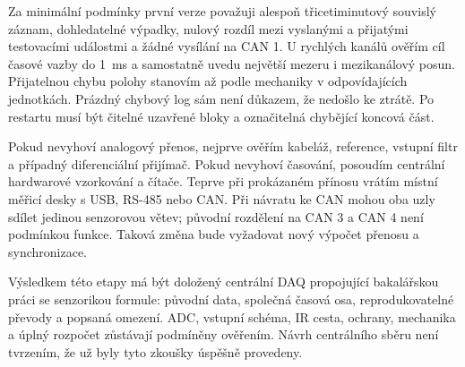 Za minimální podmínky první verze považuji alespoň třicetiminutový
souvislý záznam, dohledatelné výpadky, nulový rozdíl mezi vyslanými
a přijatými testovacími událostmi a žádné vysílání na CAN 1.
U rychlých kanálů ověřím cíl časové vazby do \SI{1}{ms} a samostatně
uvedu největší mezeru i mezikanálový posun. Přijatelnou chybu polohy
stanovím až podle mechaniky v odpovídajících jednotkách. Prázdný
chybový log sám není důkazem, že nedošlo ke ztrátě. Po restartu musí
být čitelné uzavřené bloky a označitelná chybějící koncová část.

Pokud nevyhoví analogový přenos, nejprve ověřím kabeláž, reference,
vstupní filtr a případný diferenciální přijímač. Pokud nevyhoví
časování, posoudím centrální hardwarové vzorkování a čítače.
Teprve při prokázaném přínosu vrátím místní měřicí desky s USB,
RS-485 nebo CAN. Při návratu ke CAN mohou oba uzly sdílet jedinou
senzorovou větev; původní rozdělení na CAN 3 a CAN 4 není podmínkou
funkce. Taková změna bude vyžadovat nový výpočet přenosu a synchronizace.

Výsledkem této etapy má být doložený centrální DAQ propojující
bakalářskou práci se senzorikou formule: původní data, společná časová
osa, reprodukovatelné převody a popsaná omezení. ADC, vstupní schéma,
IR cesta, ochrany, mechanika a úplný rozpočet zůstávají podmíněny
ověřením. Návrh centrálního sběru není tvrzením, že už byly tyto
zkoušky úspěšně provedeny.
